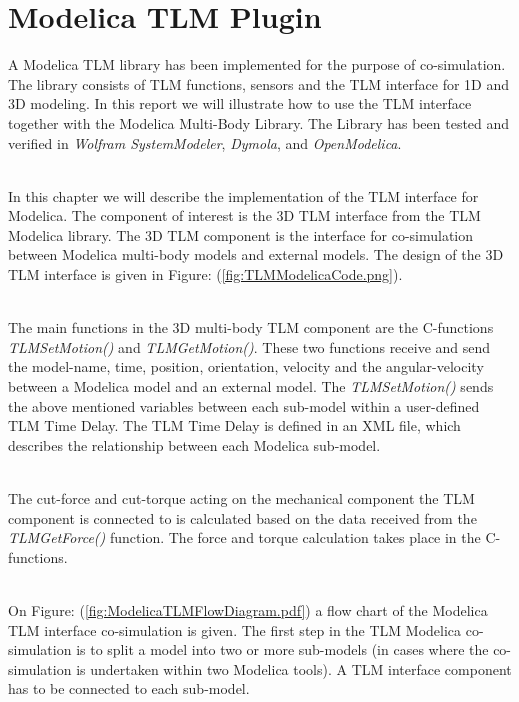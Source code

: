 \chapter{Modelica TLM Plugin}
A Modelica TLM library has been implemented for the purpose of co-simulation.
The library consists of TLM functions, sensors and the TLM interface for 1D and 3D modeling. 
In this report we will illustrate how to use the TLM interface together with the Modelica Multi-Body Library. 
The Library has been tested and verified in \emph{Wolfram SystemModeler}, \emph{Dymola}, and \emph{OpenModelica}.


~\\In this chapter we will describe the implementation of the TLM interface for Modelica. 
The component of interest is the 3D TLM interface from the TLM Modelica library. 
The 3D TLM component is the interface for co-simulation between Modelica multi-body models and external models. 
The design of the 3D TLM interface is given in Figure: (\ref{fig:TLMModelicaCode.png}).~\\


~\\The main functions in the 3D multi-body TLM component are the C-functions \emph{TLMSetMotion()} and \emph{TLMGetMotion()}. 
These two functions receive and send the model-name, time, position, orientation, velocity and the angular-velocity between a Modelica model and an external model. 
The \emph{TLMSetMotion()} sends the above mentioned variables between each sub-model within a user-defined TLM Time Delay. 
The TLM Time Delay is defined in an XML file, which describes the relationship between each Modelica sub-model.

~\\The cut-force and cut-torque acting on the mechanical component the TLM component is connected to is calculated based on the data received from the \emph{TLMGetForce()} function. 
The force and torque calculation takes place in the C-functions.


~\\On Figure: (\ref{fig:ModelicaTLMFlowDiagram.pdf}) a flow chart of the Modelica TLM interface co-simulation is given. 
The first step in the TLM Modelica co-simulation is to split a model into two or more sub-models (in cases where the co-simulation is undertaken within two Modelica tools). 
A TLM interface component has to be connected to each sub-model.


